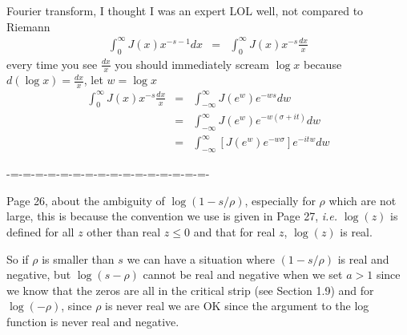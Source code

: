 \documentclass[aps,preprint,preprintnumbers,nofootinbib,showpacs,prd]{revtex4-1}
\newcommand{\ie}{{\it i.e.} }
\newcommand{\nbea}{\begin{eqnarray*}}
\newcommand{\neea}{\end{eqnarray*}}
\begin{document}
Fourier transform, I thought I was an expert LOL well, not compared to Riemann
%
\nbea
\int_0^\infty J(x) x^{-s-1} dx & = & \int_0^\infty J(x) x^{-s} \frac{dx}{x}
\neea
%
every time you see $\frac{dx}{x}$ you should immediately scream $\log x$ because $d(\log x) = \frac{dx}{x}$, let $w = \log x$
%
\nbea
\int_0^\infty J(x) x^{-s} \frac{dx}{x} & = & \int_{-\infty}^\infty J(e^w)e^{-ws} dw \\
& = & \int_{-\infty}^\infty J(e^w)e^{-w(\sigma + it)} dw \\
& = & \int_{-\infty}^\infty \left\lbrack J(e^w)e^{-w\sigma} \right\rbrack e^{-itw} dw
\neea
%

-=-=-=-=-=-=-=-=-=-=-=-=-=-=-=-=-

Page 26, about the ambiguity of $\log(1 - s/\rho)$, especially for $\rho$ which are not large, this is because the convention we use is given in Page 27, \ie $\log(z)$ is defined for all $z$ other than real $z \le 0$ and that for real $z$, $\log(z)$ is real.

So if $\rho$ is smaller than $s$ we can have a situation where $(1 - s/\rho)$ is real and negative, but $\log(s-\rho)$ cannot be real and negative when we set $a > 1$ since we know that the zeros are all in the critical strip (see Section 1.9)  and for $\log(-\rho)$, since $\rho$ is never real we are OK since the argument to the log function is never real and negative.
\end{document}
